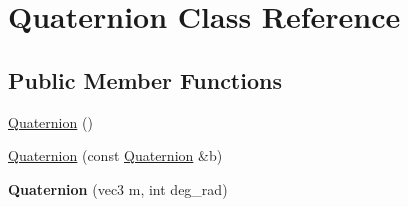 \hypertarget{classQuaternion}{\section{Quaternion Class Reference}
\label{classQuaternion}
}
\subsection*{Public Member Functions}
\begin{DoxyCompactItemize}
\item 
\hyperlink{classQuaternion_abcc01358aada56ea5f0db4da18aaf77d}{Quaternion} ()
\item 
\hyperlink{classQuaternion_a84c0cdc8392ec36aeb2679450a62210c}{Quaternion} (const \hyperlink{classQuaternion}{Quaternion} \&b)
\item 
\hypertarget{classQuaternion_a88824d18585e04056ad9fc37a8776df4}{{\bfseries Quaternion} (vec3 m, int deg\-\_\-rad)}\label{classQuaternion_a88824d18585e04056ad9fc37a8776df4}


\end{DoxyCompactItemize}
